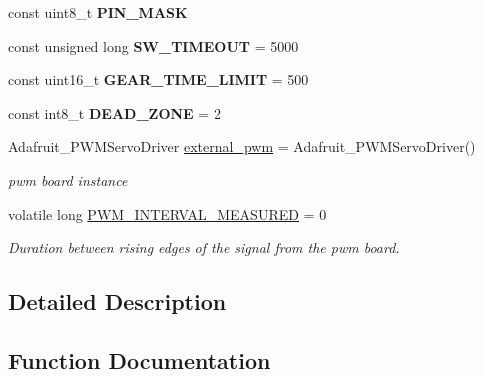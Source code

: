 \begin{DoxyCompactItemize}
\item 
const uint8\+\_\+t {\bfseries P\+I\+N\+\_\+\+M\+A\+SK}
\item 
const unsigned long {\bfseries S\+W\+\_\+\+T\+I\+M\+E\+O\+UT} = 5000\hypertarget{group__GlobalVariables_gacf921afc2a46077d6d48fc80b38f44e9}{}\label{group__GlobalVariables_gacf921afc2a46077d6d48fc80b38f44e9}

\item 
const uint16\+\_\+t {\bfseries G\+E\+A\+R\+\_\+\+T\+I\+M\+E\+\_\+\+L\+I\+M\+IT} = 500\hypertarget{group__GlobalVariables_ga4a6f8d13a634c4fbb69e18bb905c175c}{}\label{group__GlobalVariables_ga4a6f8d13a634c4fbb69e18bb905c175c}

\item 
const int8\+\_\+t {\bfseries D\+E\+A\+D\+\_\+\+Z\+O\+NE} = 2\hypertarget{group__GlobalVariables_ga8f059a42c098816d4ccebaf48add0a4a}{}\label{group__GlobalVariables_ga8f059a42c098816d4ccebaf48add0a4a}

\item 
Adafruit\+\_\+\+P\+W\+M\+Servo\+Driver \hyperlink{group__GlobalVariables_gaf45c5982a9c799a7a6acd25f272f826b}{external\+\_\+pwm} = Adafruit\+\_\+\+P\+W\+M\+Servo\+Driver()\hypertarget{group__GlobalVariables_gaf45c5982a9c799a7a6acd25f272f826b}{}\label{group__GlobalVariables_gaf45c5982a9c799a7a6acd25f272f826b}

\begin{DoxyCompactList}\small\item\em pwm board instance \end{DoxyCompactList}\item 
volatile long \hyperlink{group__GlobalVariables_ga313a0dafc729c2dbc7cbaf993c734f56}{P\+W\+M\+\_\+\+I\+N\+T\+E\+R\+V\+A\+L\+\_\+\+M\+E\+A\+S\+U\+R\+ED} = 0
\begin{DoxyCompactList}\small\item\em Duration between rising edges of the signal from the pwm board. \end{DoxyCompactList}\end{DoxyCompactItemize}


\subsection{Detailed Description}


\subsection{Function Documentation}
